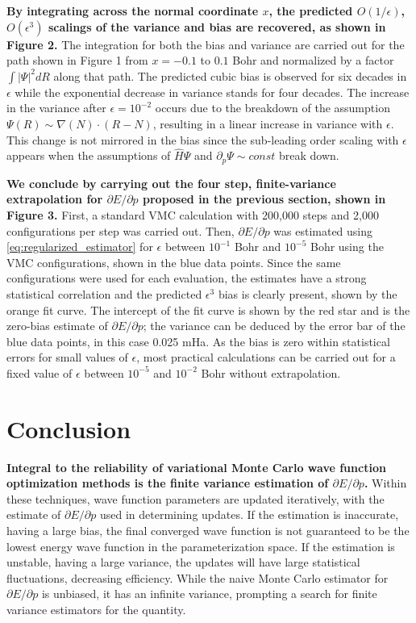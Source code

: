 \documentclass{article}
\begin{document}
\textbf{By integrating across the normal coordinate $x$, the predicted $O(1/\epsilon)$, $O(\epsilon^3)$ scalings of the variance and bias are recovered, as shown in Figure 2.} 
The integration for both the bias and variance are carried out for the path shown in Figure 1 from $x = -0.1$ to $0.1$ Bohr and normalized by a factor $\int |\Psi|^2 dR$ along that path.
The predicted cubic bias is observed for six decades in $\epsilon$ while the exponential decrease in variance stands for four decades.
The increase in the variance after $\epsilon = 10^{-2}$ occurs due to the breakdown of the assumption $\Psi(R) \sim \nabla(N) \cdot (R-N)$, resulting in a linear increase in variance with $\epsilon$.
This change is not mirrored in the bias since the sub-leading order scaling with $\epsilon$ appears when the assumptions of $\hat{H}\Psi$ and $\partial_p \Psi \sim const$ break down.

\textbf{We conclude by carrying out the four step, finite-variance extrapolation for $\partial E/\partial p$ proposed in the previous section, shown in Figure 3.}
First, a standard VMC calculation with 200,000 steps and 2,000 configurations per step was carried out.
Then, $\partial E/\partial p$ was estimated using \eqref{eq:regularized_estimator} for $\epsilon$ between $10^{-1}$ Bohr and $10^{-5}$ Bohr using the VMC configurations, shown in the blue data points.
Since the same configurations were used for each evaluation, the estimates have a strong statistical correlation and the predicted $\epsilon^3$ bias is clearly present, shown by the orange fit curve.
The intercept of the fit curve is shown by the red star and is the zero-bias estimate of $\partial E/\partial p$; the variance can be deduced by the error bar of the blue data points, in this case 0.025 mHa.
As the bias is zero within statistical errors for small values of $\epsilon$, most practical calculations can be carried out for a fixed value of $\epsilon$ between $10^{-5}$ and $10^{-2}$ Bohr without extrapolation.

\section{Conclusion}
\textbf{Integral to the reliability of variational Monte Carlo wave function optimization methods is the finite variance estimation of $\partial E/\partial p$.}
Within these techniques, wave function parameters are updated iteratively, with the estimate of $\partial E/\partial p$ used in determining updates.
If the estimation is inaccurate, having a large bias, the final converged wave function is not guaranteed to be the lowest energy wave function in the parameterization space.
If the estimation is unstable, having a large variance, the updates will have large statistical fluctuations, decreasing efficiency.
While the naive Monte Carlo estimator for $\partial E/\partial p$ is unbiased, it has an infinite variance, prompting a search for finite variance estimators for the quantity.
\end{document}
